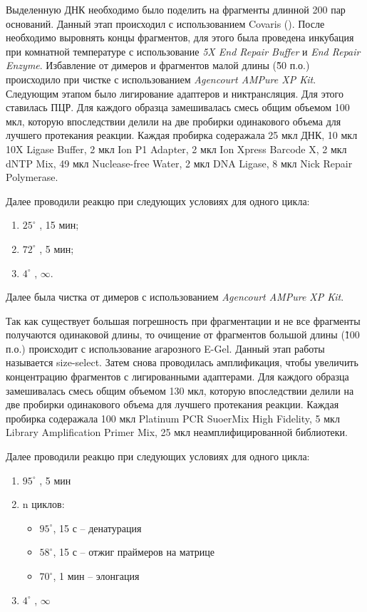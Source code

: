 Выделенную ДНК необходимо было поделить на фрагменты длинной 200 пар оснований. Данный этап происходил с использованием Covaris (). После необходимо выровнять концы фрагментов, для этого была проведена инкубация при комнатной температуре с использование  \textit{5X End Repair Buffer} и  \textit{End Repair Enzyme}. Избавление от димеров и фрагментов малой длины (\~50 п.о.) происходило при чистке с использованием \textit{Agencourt AMPure XP Kit}. Следующим этапом было лигирование адаптеров и никтрансляция. Для этого ставилась ПЦР. Для каждого образца замешивалась смесь общим объемом 100 мкл, которую впоследствии делили на две пробирки одинакового объема для лучшего протекания реакции. Каждая пробирка содеражала 25 мкл ДНК, 10 мкл 10X Ligase Buffer, 2 мкл Ion P1 Adapter, 2 мкл Ion Xpress Barcode X, 2 мкл dNTP Mix, 49 мкл Nuclease-free Water, 2 мкл DNA Ligase, 8 мкл Nick Repair Polymerase. 

Далее проводили реакцю при следующих условиях для одного цикла:

\begin{enumerate}
	\item $25^{\circ}$ , 15 мин;
	\item $72^{\circ}$ , 5 мин;
	\item $4^{\circ}$ ,  $\infty$.
\end{enumerate}

Далее была чистка от димеров с использованием \textit{Agencourt AMPure XP Kit}.

Так как существует большая погрешность при фрагментации и не все фрагменты получаются одинаковой длины, то очищение от фрагментов большой длины (\~100 п.о.) происходит с использование агарозного E-Gel. Данный этап работы называется size-select. Затем снова проводилась амплификация, чтобы увеличить концентрацию фрагментов с лигированными адаптерами. Для каждого образца замешивалась смесь общим объемом 130 мкл, которую впоследствии делили на две пробирки одинакового объема для лучшего протекания реакции. Каждая пробирка содеражала 100 мкл Platinum PCR SuoerMix High Fidelity, 5 мкл Library Amplification Primer Mix, 25 мкл неамплифицированной библиотеки. 

Далее проводили реакцю при следующих условиях для одного цикла:

\begin{enumerate}
	\item $95^{\circ}$ , 5 мин 
	\item n циклов:
	\begin{itemize}
		\item $95^{\circ}$, 15 с – денатурация
		\item $58^{\circ}$, 15 с – отжиг праймеров на матрице
		\item $70^{\circ}$, 1 мин – элонгация
	\end{itemize}
	\item $4^{\circ}$ ,  $\infty$
\end{enumerate}

